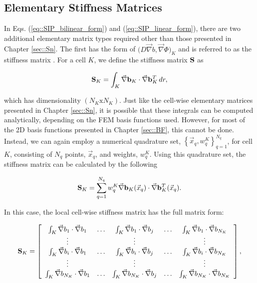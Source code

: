 \subsection{Elementary Stiffness Matrices}
\label{sec::DSA_SIP_Stiffness}

In Eqs. (\ref{eq::SIP_bilinear_form}) and (\ref{eq::SIP_linear_form}), there are two additional elementary matrix types required other than those presented in Chapter \ref{sec::Sn}. The first has the form of $\Big(  D \vec{\nabla}  b , \vec{\nabla} \Phi  \Big)_{K}$ and is referred to as the stiffness matrix \cite{akin1982application}. For a cell $K$, we define the stiffness matrix ${\bf S}$ as

\begin{equation}
\label{eq::DSA_stiffness_matrix_analytical}
{\bf S}_K =    \int_K \vec{\nabla} {\bf b}_K \cdot \vec{\nabla} {\bf b}_K^T \, d r ,
\end{equation}

\noindent which has dimensionality $(N_K \text{x} N_K)$. Just like the cell-wise elementary matrices presented in Chapter \ref{sec::Sn}, it is possible that these integrals can be computed analytically, depending on the FEM basis functions used. However, for most of the 2D basis functions presented in Chapter \ref{sec::BF}, this cannot be done. Instead, we can again employ a numerical quadrature set, $\left\{  \vec{x}_q , w_q^{K}  \right\}_{q=1}^{N_q}$, for cell $K$, consisting of $N_q$ points, $\vec{x}_q$, and weights, $w_q^K$. Using this quadrature set, the stiffness matrix can be calculated by the following

\begin{equation}
\label{eq::DSA_stiffness_matrix_numerical}
{\bf S}_K = \sum_{q = 1}^{N_q} w_{q}^K \vec{\nabla} {\bf b}_K (\vec{x}_q) \cdot  \vec{\nabla}{\bf b}_K^T (\vec{x}_q)  .
\end{equation}

\noindent In this case, the local cell-wise stiffness matrix has the full matrix form:

\begin{equation}
\label{eq::DSA_stiffness_matrix_array}
{\bf S}_K =   \left[
\begin{array} {ccccc}
	\int_K \vec{\nabla}b_1 \cdot \vec{\nabla} b_1  & \ldots & \int_K \vec{\nabla}b_1 \cdot \vec{\nabla} b_j  & \ldots & \int_K \vec{\nabla}b_1 \cdot \vec{\nabla}b_{N_K} \\
	\vdots  &  & \vdots  &  & \vdots \\
	\int_K \vec{\nabla} b_i \cdot \vec{\nabla} b_1  & \ldots & \int_K \vec{\nabla}b_i \cdot \vec{\nabla} b_j  & \ldots & \int_K \vec{\nabla}b_i \cdot \vec{\nabla}b_{N_K} \\
	\vdots  &  & \vdots  &  & \vdots \\
	\int_K \vec{\nabla} b_{N_K}\cdot \vec{\nabla} b_1  & \ldots & \int_K \vec{\nabla} b_{N_K}\cdot \vec{\nabla} b_j  & \ldots & \int_K \vec{\nabla} b_{N_K} \cdot \vec{\nabla} b_{N_K} \\
\end{array}
\right] ,
\end{equation}

